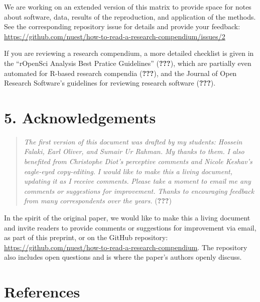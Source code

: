 \documentclass[twocolumn]{article}
\begin{document}
We are working on an extended version of this matrix to provide space
for notes about software, data, results of the reproduction, and
application of the methods. See the corresponding repository issue for
details and provide your feedback:
\url{https://github.com/nuest/how-to-read-a-research-compendium/issues/2}

If you are reviewing a research compendium, a more detailed checklist is
given in the ``rOpenSci Analysis Best Pratice Guidelines''
({\textbf{???}}), which are partially even automated for R-based
research compendia ({\textbf{???}}), and the Journal of Open Research
Software's guidelines for reviewing research software ({\textbf{???}}).

\hypertarget{acknowledgements}{%
\section*{5. Acknowledgements}\label{acknowledgements}}

\begin{quote}
\emph{The first version of this document was drafted by my students:
Hossein Falaki, Earl Oliver, and Sumair Ur Rahman.} \emph{My thanks to
them.} \emph{I also benefited from Christophe Diot's perceptive comments
and Nicole Keshav's eagle-eyed copy-editing.} \emph{I would like to make
this a living document, updating it as I receive comments.} \emph{Please
take a moment to email me any comments or suggestions for improvement.}
\emph{Thanks to encouraging feedback from many correspondents over the
years.} ({\textbf{???}})
\end{quote}

In the spirit of the original paper, we would like to make this a living
document and invite readers to provide comments or suggestions for
improvement via email, as part of this preprint, or on the GitHub
repository:
\url{https://github.com/nuest/how-to-read-a-research-compendium}. The
repository also includes open questions and is where the paper's authors
openly discuss.

\hypertarget{references}{%
\section*{References}\label{references}}
\end{document}
